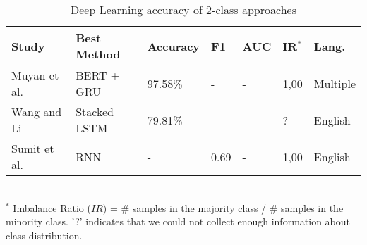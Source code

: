 \begin{table}[ht]
    \caption{Deep Learning accuracy of 2-class approaches }
    \label{tab:DL_performance_2class}
    \centering
    \begin{tabular}{l l l l l l l}
        \toprule
        \textbf{Study} & \textbf{Best Method} & \textbf{Accuracy} & \textbf{F1} & \textbf{AUC} & \textbf{IR$^*$} & \textbf{Lang.} \\ 
        \midrule
        Muyan et al.~\cite{Li2022_lr2019} & BERT + GRU & 97.58\% & - & - & 1,00 & Multiple \\
        Wang and Li~\cite{Wang2020_lr26} &  Stacked LSTM & 79.81\% & - & - & ? & English \\
        Sumit et al.~\cite{Asthana2021_lr76} & RNN & - & 0.69 & - & 1,00 & English \\
        \bottomrule
    \end{tabular}
    \\ \vspace{0.1cm}
    \footnotesize
    $^*$ Imbalance Ratio ($IR$) = \# samples in the majority class / \# samples in the minority class. '?' indicates that we could not collect enough information about class distribution.
\end{table}